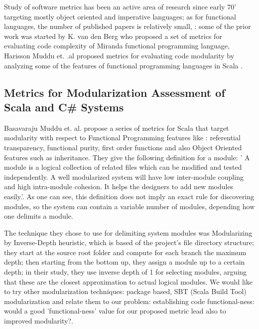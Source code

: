 \documentclass{article}
\begin{document}
Study of software metrics has been an active area of research since early 70' targeting mostly object oriented and imperative languages; as for functional languages, the number of published papers is relatively small, : some of the prior work was started by K. van den Berg \cite{DBLP:journals/infsof/BergB95} who proposed a set of metrics for evaluating code complexity of Miranda functional programming language, Harisson   Muddu et. .al proposed metrics for evaluating code modularity by analyzing some of the features of functional programming languages in Scala \cite{DBLP:conf/icse/MudduABP13}. 



\subsection{Metrics for Modularization Assessment of Scala and C\# Systems }

Basavaraju Muddu et. al. \cite{DBLP:conf/icse/MudduABP13} propose a series of metrics for Scala that target modularity with respect to Functional Programming features like : referential transparency, functional purity, first order functions and also Object Oriented features such as inheritance. They give the following definition for a module: ' A module is a logical collection of related files which can be modified and tested independently. A well modularized system will have low inter-module coupling and high intra-module cohesion. It helps the designers to add new modules easily.'\cite{DBLP:conf/icse/MudduABP13}. As one can see, this definition does not imply an exact rule for discovering  modules, so the system can contain a variable number of modules, depending how one delimits a module. \par

The technique they chose to use for delimiting system modules  was Modularizing by  Inverse-Depth heuristic, which is based of the project's file directory structure; they start at the source root folder and compute for each branch the maximum depth; then starting from the bottom up, they assign a module up to a certain depth; in their study, they use inverse depth of 1 for selecting modules, arguing that these are the closest approximation to actual logical modules. We would like to try other modularization techniques: package based, SBT (Scala Build Tool)  modularization and relate them to our problem: establishing code functional-ness: would a good 'functional-ness' value for our proposed metric lead also to improved modularity?.\par
\end{document}
